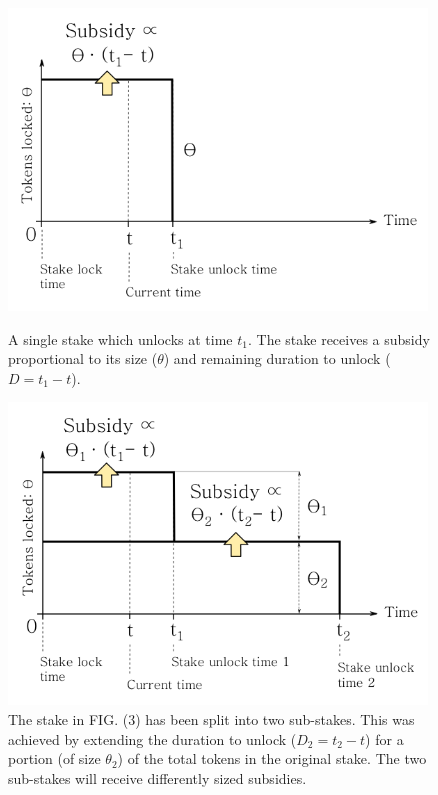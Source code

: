\documentclass[longbibliography,nofootinbib]{revtex4-1}
\begin{document}
\begin{figure}[h!]
 \centering
    \begin{minipage}{0.48\textwidth}
        \centering
        \includegraphics[width=0.99\textwidth]{graphs/one-step.png}
        \caption{A single stake which unlocks at time $t_1$. The stake receives a subsidy proportional to its size ($\theta$) and remaining duration to unlock ($D = t_1 - t$).}
    \end{minipage}\hfill
    \begin{minipage}{0.48\textwidth}
        \centering
        \includegraphics[width=0.99\textwidth]{graphs/two-steps.png}
        \caption{The stake in FIG. (3) has been split into two sub-stakes. This was achieved by extending the duration to unlock ($D_2 = t_2 - t$) for a portion (of size $\theta_2$) of the total tokens in the original stake. The two sub-stakes will receive differently sized subsidies.}
    \end{minipage}
\end{figure}
\end{document}
